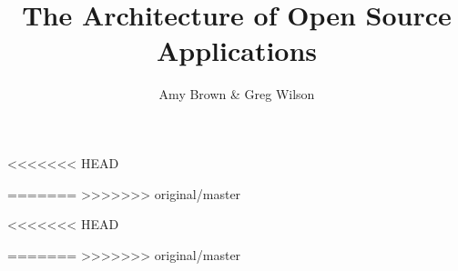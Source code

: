 \documentclass{book}
\author{Amy Brown \& Greg Wilson}
\title{The Architecture of Open Source Applications}
\date{}
\begin{document}
\frontmatter


\tableofcontents



\mainmatter
<<<<<<< HEAD


=======
>>>>>>> original/master









<<<<<<< HEAD


=======
>>>>>>> original/master




  
  
  












\makeatletter
\@openrightfalse
\makeatother

\backmatter


\end{document}
